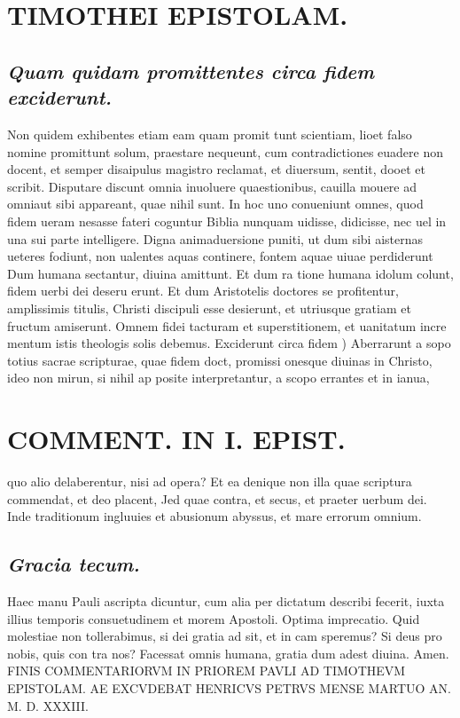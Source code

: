 \documentclass{article}
\begin{document}
\begin{pages}
\section*{TIMOTHEI EPISTOLAM. }
\marginpar{[ p.189 ]}
{}
\subsection*{\textit{Quam quidam promittentes circa fidem exciderunt. }}\pstart Non quidem exhibentes etiam eam quam promit tunt scientiam, lioet falso nomine promittunt solum, praestare nequeunt, cum contradictiones euadere non docent, et semper disaipulus magistro reclamat, et diuersum, sentit, dooet et scribit. Disputare discunt omnia inuoluere quaestionibus, cauilla mouere ad omniaut sibi appareant, quae nihil sunt. In hoc uno conueniunt omnes, quod fidem ueram nesasse fateri coguntur Biblia nunquam uidisse, didicisse, nec uel in una sui parte intelligere. Digna animaduersione puniti, ut dum sibi aisternas ueteres fodiunt, non ualentes aquas continere, fontem aquae uiuae perdiderunt Dum humana sectantur, diuina amittunt. Et dum ra tione humana idolum colunt, fidem uerbi dei deseru erunt. Et dum Aristotelis doctores se profitentur, amplissimis titulis, Christi discipuli esse desierunt, et utriusque gratiam et fructum amiserunt. Omnem fidei tacturam et superstitionem, et uanitatum incre mentum istis theologis solis debemus.  \pend\pstart Exciderunt circa fidem ) Aberrarunt a sopo totius sacrae scripturae, quae fidem doct, promissi onesque diuinas in Christo, ideo non mirun, si nihil ap posite interpretantur, a scopo errantes et in ianua,  \pend
\section*{COMMENT. IN I. EPIST. }
\marginpar{[ p.190 ]}\pstart quo alio delaberentur, nisi ad opera? Et ea denique  non illa quae scriptura commendat, et deo placent, Jed quae contra, et secus, et praeter uerbum dei. Inde traditionum ingluuies et abusionum abyssus, et mare errorum omnium.  \pend
{}
{}
\subsection*{\textit{Gracia tecum. }}\pstart Haec manu Pauli ascripta dicuntur, cum alia per dictatum describi fecerit, iuxta illius temporis consuetudinem et morem Apostoli. Optima imprecatio. Quid molestiae non tollerabimus, si dei gratia ad sit, et in cam speremus? Si deus pro nobis, quis con tra nos? Facessat omnis humana, gratia dum adest diuina. Amen.  \pend\pstart FINIS COMMENTARIORVM IN PRIOREM PAVLI AD TIMOTHEVM EPISTOLAM.  \pendBASILEA AE EXCVDEBAT HENRICVS PETRVS MENSE MARTUO AN. M. D. XXXIII. 
\endnumbering
\end{pages}
\end{document}
